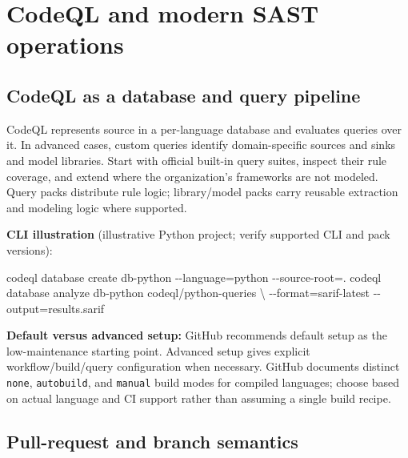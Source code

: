 \documentclass[
  letterpaper,
]{article}
\newenvironment{Shaded}{}{}
\newcommand{\AttributeTok}[1]{\textcolor[rgb]{0.49,0.56,0.16}{#1}}
\newcommand{\DataTypeTok}[1]{\textcolor[rgb]{0.56,0.13,0.00}{#1}}
\newcommand{\ExtensionTok}[1]{#1}
\newcommand{\NormalTok}[1]{#1}
\newcommand{\OperatorTok}[1]{\textcolor[rgb]{0.40,0.40,0.40}{#1}}
\begin{document}
\section{CodeQL and modern SAST
operations}\label{codeql-and-modern-sast-operations}

\subsection{CodeQL as a database and query
pipeline}\label{codeql-as-a-database-and-query-pipeline}

CodeQL represents source in a per-language database and evaluates
queries over it. In advanced cases, custom queries identify
domain-specific sources and sinks and model libraries. Start with
official built-in query suites, inspect their rule coverage, and extend
where the organization's frameworks are not modeled. Query packs
distribute rule logic; library/model packs carry reusable extraction and
modeling logic where supported.

\textbf{CLI illustration} (illustrative Python project; verify supported
CLI and pack versions):

\begin{Shaded}
\begin{Highlighting}[]
\ExtensionTok{codeql}\NormalTok{ database create db{-}python }\AttributeTok{{-}{-}language}\OperatorTok{=}\NormalTok{python }\AttributeTok{{-}{-}source{-}root}\OperatorTok{=}\NormalTok{.}
\ExtensionTok{codeql}\NormalTok{ database analyze db{-}python codeql/python{-}queries }\DataTypeTok{\textbackslash{}}
  \AttributeTok{{-}{-}format}\OperatorTok{=}\NormalTok{sarif{-}latest }\AttributeTok{{-}{-}output}\OperatorTok{=}\NormalTok{results.sarif}
\end{Highlighting}
\end{Shaded}

\textbf{Default versus advanced setup:} GitHub recommends default setup
as the low-maintenance starting point. Advanced setup gives explicit
workflow/build/query configuration when necessary. GitHub documents
distinct \texttt{none}, \texttt{autobuild}, and \texttt{manual} build
modes for compiled languages; choose based on actual language and CI
support rather than assuming a single build recipe.

\subsection{Pull-request and branch
semantics}\label{pull-request-and-branch-semantics}
\end{document}
